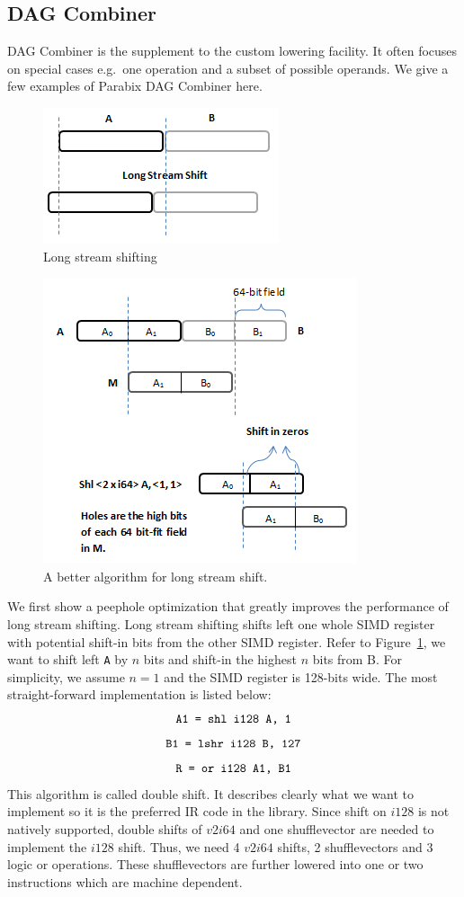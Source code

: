 \subsection{DAG Combiner}
\label{sec:long_shift}
DAG Combiner is the supplement to the custom lowering facility. It often focuses on special cases e.g.\ one operation and a subset of possible operands. We give a few examples of Parabix DAG Combiner here.

\begin{figure}[htbp!]
\centering
\includegraphics[scale=0.8]{draw/long_shift.png}
\caption{Long stream shifting}
\label{fig:long_shift}
\end{figure}

\begin{figure}[htbp!]
\centering
\includegraphics[scale=0.9]{draw/long_shift_good.png}
\caption{A better algorithm for long stream shift.}
\label{fig:long_shift_good}
\end{figure}

We first show a peephole optimization that greatly improves the performance of long stream shifting. Long stream shifting shifts left one whole SIMD register with potential shift-in bits from the other SIMD register. Refer to Figure~\ref{fig:long_shift}, we want to shift left {\tt A} by $n$ bits and shift-in the highest $n$ bits from B. For simplicity, we assume $n = 1$ and the SIMD register is 128-bits wide. The most straight-forward implementation is listed below:
  \[ \text{\tt A1 = shl i128 A, 1} \]
  \[ \text{\tt B1 = lshr i128 B, 127} \]
  \[ \text{\tt R = or i128 A1, B1} \]
This algorithm is called double shift. It describes clearly what we want to implement so it is the preferred IR code in the library. Since shift on $i128$ is not natively supported, double shifts of $v2i64$ and one shufflevector are needed to implement the $i128$ shift. Thus, we need 4 $v2i64$ shifts, 2 shufflevectors and 3 logic or operations. These shufflevectors are further lowered into one or two instructions which are machine dependent.

